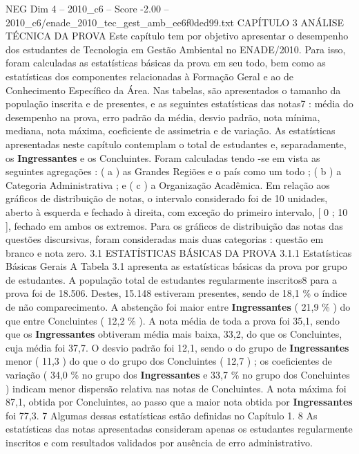 \begin{textsample}{NEG Dim 4 – 2010\_c6 – Score -2.00 – 2010\_c6/enade\_2010\_tec\_gest\_amb\_ee6f0ded99.txt}  \label{ex:f4_neg_046}
CAPÍTULO 3 ANÁLISE TÉCNICA DA PROVA Este capítulo tem por objetivo apresentar o desempenho dos estudantes de Tecnologia em Gestão Ambiental no ENADE/2010.
Para isso, foram calculadas as estatísticas básicas da prova em seu todo, bem como as estatísticas dos componentes relacionadas à Formação Geral e ao de Conhecimento Específico da Área.
Nas tabelas, são apresentados o tamanho da população inscrita e de presentes, e as seguintes estatísticas das notas7 : média do desempenho na prova, erro padrão da média, desvio padrão, nota mínima, mediana, nota máxima, coeficiente de assimetria e de variação.
As estatísticas apresentadas neste capítulo contemplam o total de estudantes e, separadamente, os \textbf{Ingressantes} e os Concluintes.
Foram calculadas tendo -se em vista as seguintes agregações : ( a ) as Grandes Regiões e o país como um todo ; ( b ) a Categoria Administrativa ; e ( c ) a Organização Acadêmica.
Em relação aos gráficos de distribuição de notas, o intervalo considerado foi de 10 unidades, aberto à esquerda e fechado à direita, com exceção do primeiro intervalo, [ 0 ; 10 ], fechado em ambos os extremos.
Para os gráficos de distribuição das notas das questões discursivas, foram consideradas mais duas categorias : questão em branco e nota zero. 3.1 ESTATÍSTICAS BÁSICAS DA PROVA 3.1.1 Estatísticas Básicas Gerais A Tabela 3.1 apresenta as estatísticas básicas da prova por grupo de estudantes.
A população total de estudantes regularmente inscritos8 para a prova foi de 18.506.
Destes, 15.148 estiveram presentes, sendo de 18,1 \% o índice de não comparecimento.
A abstenção foi maior entre \textbf{Ingressantes} ( 21,9 \% ) do que entre Concluintes ( 12,2 \% ).
A nota média de toda a prova foi 35,1, sendo que os \textbf{Ingressantes} obtiveram média mais baixa, 33,2, do que os Concluintes, cuja média foi 37,7.
O desvio padrão foi 12,1, sendo o do grupo de \textbf{Ingressantes} menor ( 11,3 ) do que o do grupo dos Concluintes ( 12,7 ) ; os coeficientes de variação ( 34,0 \% no grupo dos \textbf{Ingressantes} e 33,7 \% no grupo dos Concluintes ) indicam menor dispersão relativa nas notas de Concluintes.
A nota máxima foi 87,1, obtida por Concluintes, ao passo que a maior nota obtida por \textbf{Ingressantes} foi 77,3. 7 Algumas dessas estatísticas estão definidas no Capítulo 1. 8 As estatísticas das notas apresentadas consideram apenas os estudantes regularmente inscritos e com resultados validados por ausência de erro administrativo.

\end{textsample}
